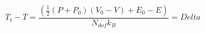 


$$
T_t - T = \frac{\left(\frac{1}{2}\left(P + P_0\right)\left(V_0 - V\right) + E_0 - E\right)}{N_{dof} k_B } = Delta
$$


